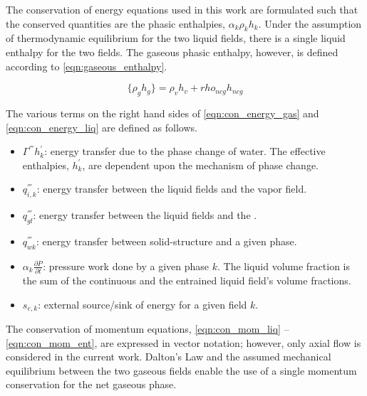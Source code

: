 The conservation of energy equations used in this work are formulated such that the conserved quantities are the phasic enthalpies, $\alpha_k \rho_k h_k$.
Under the assumption of thermodynamic equilibrium for the two liquid fields, there is a single liquid enthalpy for the two fields.
The gaseous phasic enthalpy, however, is defined according to \eqref{eqn:gaseous_enthalpy}.

\begin{equation}
\label{eqn:gaseous_enthalpy}
\{\rho_g h_g\} = \rho_v h_v + rho_{ncg} h_{ncg}
\end{equation}

The various terms on the right hand sides of \eqref{eqn:con_energy_gas} and \eqref{eqn:con_energy_liq} are defined as follows.
\begin{itemize}
\item{
$\Gamma^{'''} h^{'}_k$:
 energy transfer due to the phase change of water.
 The effective enthalpies, $h^{'}_k$, are dependent upon the mechanism of phase change.
}
\item{
$q^{'''}_{i,k}$:
energy transfer between the liquid fields and the vapor field.
}
\item{
$q^{'''}_{gl}$:
energy transfer between the liquid fields and the \ncgs.
}
\item{
$q^{'''}_{wk}$:
 energy transfer between solid-structure and a given phase.
}
\item{
$\alpha_k \frac{\partial P}{\partial t}$:
 pressure work done by a given phase $k$.
 The liquid volume fraction is the sum of the continuous and the entrained liquid field's volume fractions.
}
\item{
$s_{e,k}$:
 external source/sink of energy for a given field $k$.
}
\end{itemize}

The conservation of momentum equations, \eqref{eqn:con_mom_liq} -- \eqref{eqn:con_mom_ent}, are expressed in vector notation; however, only axial flow is considered in the current work.
Dalton's Law and the assumed mechanical equilibrium between the two gaseous fields enable the use of a single momentum conservation for the net gaseous phase.

